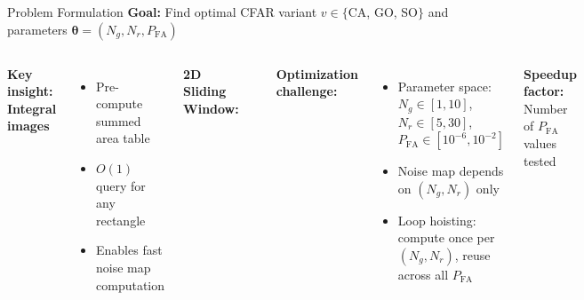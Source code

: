 \documentclass[aspectratio=169, 10pt]{beamer}
\begin{document}
\begin{frame}{Problem Formulation}
\small
\textbf{Goal:} Find optimal CFAR variant $v \in \{$CA, GO, SO$\}$ and parameters $\boldsymbol{\theta} = (N_g, N_r, P_{\mathrm{FA}})$

\vspace{0.3cm}
\begin{columns}[T]
\textbf{Key insight: Integral images}
\begin{itemize}
    \item Pre-compute summed area table
    \item $O(1)$ query for any rectangle
    \item Enables fast noise map computation
\end{itemize}

\vspace{0.3cm}
\textbf{2D Sliding Window:}
\begin{center}
\end{center}

\textbf{Optimization challenge:}
\begin{itemize}
    \item Parameter space: $N_g \in [1,10]$, $N_r \in [5,30]$, $P_{\mathrm{FA}} \in [10^{-6}, 10^{-2}]$
    \item Noise map depends on $(N_g, N_r)$ only
    \item \alert{Loop hoisting:} compute once per $(N_g, N_r)$, reuse across all $P_{\mathrm{FA}}$
\end{itemize}

\vspace{0.3cm}
\textbf{Speedup factor:} Number of $P_{\mathrm{FA}}$ values tested
\end{columns}
\end{frame}
\end{document}
